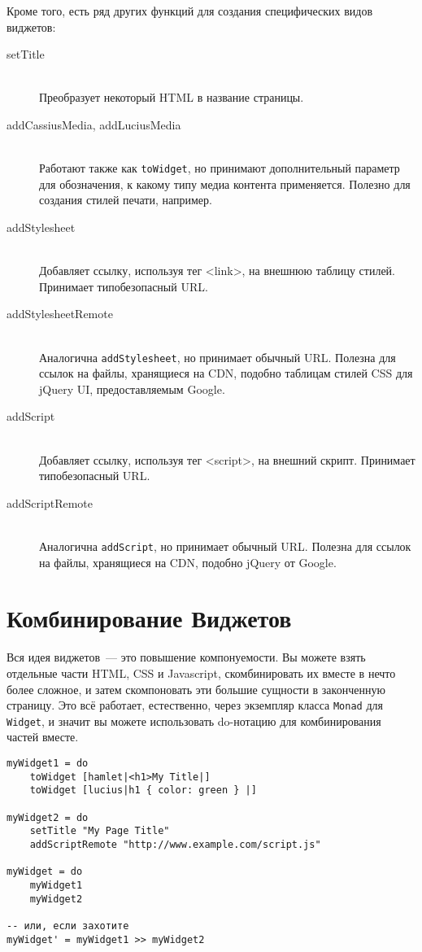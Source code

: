 Кроме того, есть ряд других функций для создания специфических видов виджетов:
\begin{description}
    \item[setTitle] \hfill \\
        Преобразует некоторый HTML в название страницы.

    \item[addCassiusMedia, addLuciusMedia] \hfill \\
        Работают также как \lstinline'toWidget', но принимают дополнительный
        параметр для обозначения, к какому типу медиа контента применяется.
        Полезно для создания стилей печати, например.

    \item[addStylesheet] \hfill \\
        Добавляет ссылку, используя тег <link>, на внешнюю таблицу стилей.
        Принимает типобезопасный URL.

    \item[addStylesheetRemote] \hfill \\
        Аналогична \lstinline'addStylesheet', но принимает обычный URL. Полезна
        для ссылок на файлы, хранящиеся на CDN, подобно таблицам стилей CSS для
        jQuery UI, предоставляемым Google.

    \item[addScript] \hfill \\
        Добавляет ссылку, используя тег <script>, на внешний скрипт. Принимает
        типобезопасный URL.

    \item[addScriptRemote] \hfill \\
        Аналогична \lstinline'addScript', но принимает обычный URL. Полезна для
        ссылок на файлы, хранящиеся на CDN, подобно jQuery от Google.
\end{description}

\section{Комбинирование Виджетов}
Вся идея виджетов~--- это повышение компонуемости. Вы можете взять отдельные
части HTML, CSS и Javascript, скомбинировать их вместе в нечто более сложное, и
затем скомпоновать эти большие сущности в законченную страницу. Это всё
работает, естественно, через экземпляр класса \lstinline'Monad' для
\lstinline'Widget', и значит вы можете использовать do-нотацию для
комбинирования частей вместе.
\begin{lstlisting}[caption={Комбинирование Виджетов}]
myWidget1 = do
    toWidget [hamlet|<h1>My Title|]
    toWidget [lucius|h1 { color: green } |]

myWidget2 = do
    setTitle "My Page Title"
    addScriptRemote "http://www.example.com/script.js"

myWidget = do
    myWidget1
    myWidget2

-- или, если захотите
myWidget' = myWidget1 >> myWidget2
\end{lstlisting}

